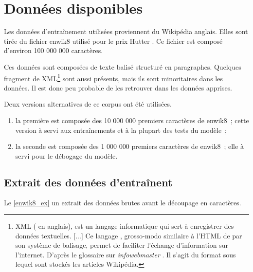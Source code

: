 \chapter{Données disponibles}
Les données d'entraînement utilisées proviennent du Wikipédia anglais.
Elles sont tirée du fichier \og enwik8\fg{} utilisé pour le prix Hutter \autocite{enwik8,Hutter2018Feb}. Ce fichier est composé d'environ 100 000 000 caractères.

Ces données sont composées de texte balisé structuré en paragraphes.
Quelques fragment de XML\footnote{XML ( en anglais), \og est un langage informatique qui sert à enregistrer des données textuelles. [...] Ce langage , grosso-modo similaire à l'HTML de par son système de balisage, permet de faciliter l'échange d'information sur l'internet.\fg{} D'après le glossaire sur \emph{infowebmaster} \autocite{xml}. Il s'agit du format sous lequel sont stockés les articles Wikipédia.}
sont aussi présents, mais ils sont minoritaires dans les données. Il est donc peu probable de les retrouver dans les données apprises.

Deux versions alternatives de ce corpus ont été utilisées.
\begin{enumerate}
	\item la première est composée des 10 000 000 premiers caractères de \og enwik8\fg{}~; cette version à servi aux entraînements et à la plupart des tests du modèle~; %
	\item la seconde est composée des 1 000 000 premiers caractères de \og enwik8\fg{}~; elle à servi pour le débogage du modèle. %
\end{enumerate}

\section{Extrait des données d'entraînent}
Le \autoref{enwik8_ex} un extrait des données brutes avant le découpage en caractères.


